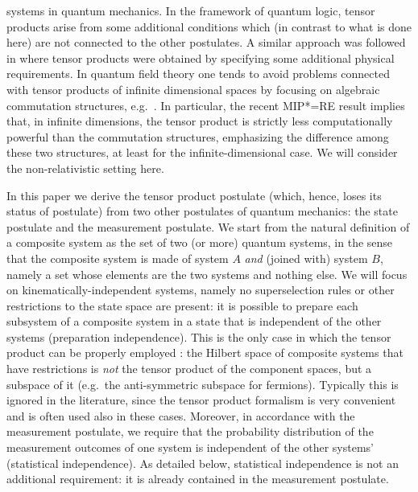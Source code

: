 \documentclass[aps,prl,amsmath,amssymb,twocolumn,nofootinbib]{revtex4}
\theoremstyle{plain}
\theoremstyle{definition}
\theoremstyle{remark}
\begin{document}
systems in quantum mechanics. In the framework of quantum logic,
tensor products arise from some additional conditions \cite{matolcsi}
which (in contrast to what is done here) are not connected to the
other postulates. A similar approach was followed in \cite{aerts}
where tensor products were obtained by specifying some additional
physical requirements. In quantum field theory one tends to avoid
problems connected with tensor products of infinite dimensional spaces
by focusing on algebraic commutation structures, e.g.~\cite{giddins}.
In particular, the recent MIP*=RE result \cite{mipre} implies that, in
infinite dimensions, the tensor product is strictly less
computationally powerful than the commutation structures, emphasizing
the difference among these two structures, at least for the
infinite-dimensional case. We will consider the non-relativistic
setting here.

In this paper we derive the tensor product postulate (which, hence,
loses its status of postulate) from two other postulates of quantum
mechanics: the state postulate and the measurement postulate. We start
from the natural definition of a composite system as the set of two
(or more) quantum systems, in the sense that the composite system is
made of system $A$ {\em and} (joined with) system $B$, namely a set
whose elements are the two systems and nothing else. We will focus on
kinematically-independent systems, namely no superselection rules or
other restrictions to the state space are present: it is possible to
prepare each subsystem of a composite system in a state that is
independent of the other systems (preparation independence).  This is
the only case in which the tensor product can be properly employed
\cite{susskind,zanardi,zanardilloyd}: the Hilbert space of composite
systems that have restrictions is {\em not} the tensor product of the
component spaces, but a subspace of it (e.g.~the anti-symmetric
subspace for fermions). Typically this is ignored in the literature,
since the tensor product formalism is very convenient and is often
used also in these cases. Moreover, in accordance with the measurement
postulate, we require that the probability distribution of the
measurement outcomes of one system is independent of the other systems' (statistical
independence). As detailed below, statistical independence is not an
additional requirement: it is already contained in the measurement
postulate.
\end{document}
